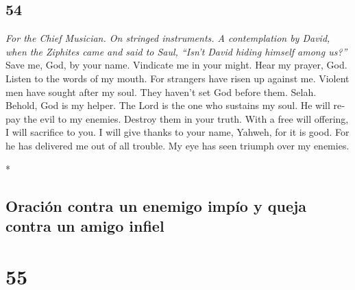 \begin{paracol}{2}
\switchcolumn
\begin{otherlanguage}{english}

\hypertarget{section-107}{%
\section{54}\label{section-107}}

\emph{For the Chief Musician. On stringed instruments. A contemplation
by David, when the Ziphites came and said to Saul, ``Isn't David hiding
himself among us?''}\\
 Save me, God, by your name. Vindicate me in your might.
 Hear my prayer, God. Listen to the words of my mouth.
 For strangers have risen up against me. Violent men have
sought after my soul. They haven't set God before them. Selah.
 Behold, God is my helper. The Lord is the one who
sustains my soul.  He will repay the evil to my enemies.
Destroy them in your truth.  With a free will offering, I
will sacrifice to you. I will give thanks to your name, Yahweh, for it
is good.  For he has delivered me out of all trouble. My
eye has seen triumph over my enemies.

\end{otherlanguage}

\switchcolumn[0]*

\hypertarget{oraciuxf3n-contra-un-enemigo-impuxedo-y-queja-contra-un-amigo-infiel}{%
\subsection{Oración contra un enemigo impío y queja contra un amigo
infiel}\label{oraciuxf3n-contra-un-enemigo-impuxedo-y-queja-contra-un-amigo-infiel}}

\hypertarget{section-108}{%
\section{55}\label{section-108}}


\end{paracol}
